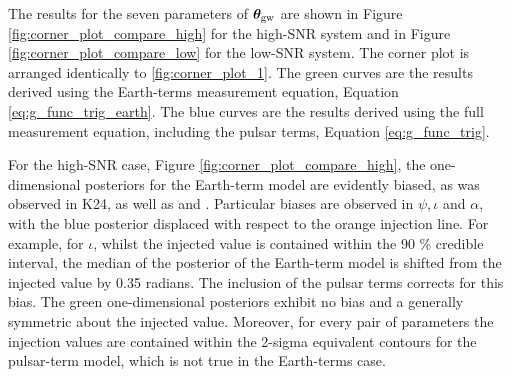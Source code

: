 \documentclass[fleqn,usenatbib,useAMS]{mnras}
\begin{document}
The results for the seven parameters of  $\boldsymbol{\theta}_{\rm gw}$ are shown in Figure \ref{fig:corner_plot_compare_high} for the high-SNR system and in Figure \ref{fig:corner_plot_compare_low} for the low-SNR system. The corner plot is arranged identically to \ref{fig:corner_plot_1}. The green curves are the results derived using the Earth-terms measurement equation, Equation \ref{eq:g_func_trig_earth}. The blue curves are the results derived using the full measurement equation, including the pulsar terms, Equation \eqref{eq:g_func_trig}. \newline 
		
For the high-SNR case, Figure \ref{fig:corner_plot_compare_high}, the one-dimensional posteriors for the Earth-term model are evidently biased, as was observed in K24, as well as \cite{Zhupulsarterms} and \cite{Chen2022}. Particular biases are observed in $\psi, \iota $ and $\alpha$, with the blue posterior displaced with respect to the orange injection line. For example, for $\iota$, whilst the injected value is contained within the 90 \% credible interval, the median of the posterior of the Earth-term model is shifted from the injected value by 0.35 radians. The inclusion of the pulsar terms corrects for this bias. The green one-dimensional posteriors exhibit no bias and a generally symmetric about the injected value. Moreover, for every pair of parameters the injection values are contained within the 2-sigma equivalent contours for the pulsar-term model, which is not true in the Earth-terms case. \newline 
\end{document}
